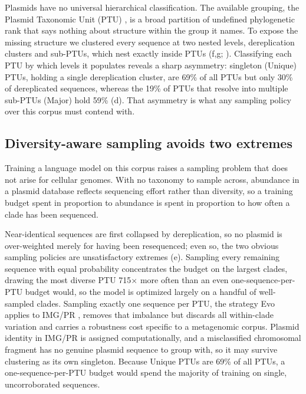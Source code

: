 Plasmids have no universal hierarchical classification. The available
grouping, the Plasmid Taxonomic Unit (PTU) \cite{redondosalvo2020pathways},
is a broad partition of undefined phylogenetic rank that says nothing about
structure within the group it names. To expose the missing structure we
clustered every sequence at two nested levels, dereplication clusters and
sub-PTUs, which nest exactly inside PTUs \cite{jain2018high}
(f,g; ). Classifying each PTU by
which levels it populates reveals a sharp asymmetry: singleton (Unique) PTUs,
holding a single dereplication cluster, are 69\% of all PTUs but only 30\% of
dereplicated sequences, whereas the 19\% of PTUs that resolve into multiple
sub-PTUs (Major) hold 59\% (d). That asymmetry is what
any sampling policy over this corpus must contend with.


\subsection*{Diversity-aware sampling avoids two extremes}
\label{sec:sampling}

Training a language model on this corpus raises a sampling problem that does
not arise for cellular genomes. With no taxonomy to sample across, abundance
in a plasmid database reflects sequencing effort rather than diversity, so a
training budget spent in proportion to abundance is spent in proportion to
how often a clade has been sequenced.

Near-identical sequences are first collapsed by dereplication, so no plasmid
is over-weighted merely for having been resequenced; even so, the two obvious
sampling policies are unsatisfactory extremes (e).
Sampling every remaining sequence with equal probability concentrates the
budget on the largest clades, drawing the most diverse PTU 715$\times$ more
often than an even one-sequence-per-PTU budget would, so the model is
optimized largely on a handful of well-sampled clades. Sampling exactly one
sequence per PTU, the strategy Evo applies to IMG/PR
\cite{nguyen2024sequence}, removes that imbalance but discards all
within-clade variation and carries a robustness cost specific to a
metagenomic corpus. Plasmid identity in IMG/PR is assigned computationally,
and a misclassified chromosomal fragment has no genuine plasmid sequence to
group with, so it may survive clustering as its own singleton. Because
Unique PTUs are 69\% of all PTUs, a one-sequence-per-PTU budget would spend
the majority of training on single, uncorroborated sequences.

